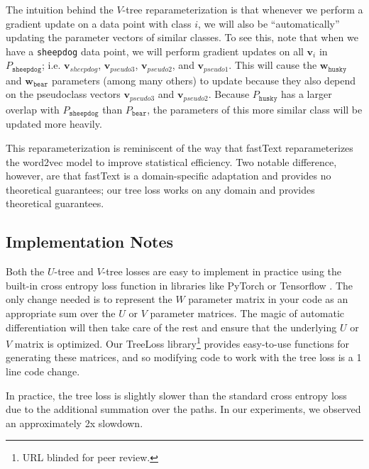 \documentclass[twoside]{article}
\newcommand{\vv}{\mathbf v}
\newcommand{\w}{\mathbf w}
\begin{document}
The intuition behind the $V$-tree reparameterization is that whenever we perform a gradient update on a data point with class $i$,
we will also be ``automatically'' updating the parameter vectors of similar classes.
To see this, note that when we have a \texttt{sheepdog} data point,
we will perform gradient updates on all $\vv_i$ in $P_\texttt{sheepdog}$; i.e. $\vv_{sheepdog}$, $\vv_{\textit{pseudo3}}$, $\vv_{\textit{pseudo2}}$, and $\vv_{\textit{pseudo1}}$.
This will cause the $\w_{\texttt{husky}}$ and $\w_{\texttt{bear}}$ parameters (among many others) to update because they also depend on the pseudoclass vectors $\vv_{\textit{pseudo3}}$ and $\vv{_\textit{pseudo2}}$.
Because $P_\texttt{husky}$ has a larger overlap with $P_\texttt{sheepdog}$ than $P_\texttt{bear}$,
the parameters of this more similar class will be updated more heavily.

This reparameterization is reminiscent of the way that fastText \citep{bojanowski2017enriching} reparameterizes the word2vec \citep{Mikolov2013EfficientEO} model to improve statistical efficiency.
Two notable difference, however, are that fastText is a domain-specific adaptation and provides no theoretical guarantees;
our tree loss works on any domain and provides theoretical guarantees.

\subsection{Implementation Notes}

Both the $U$-tree and $V$-tree losses are easy to implement in practice using the built-in cross entropy loss function in libraries like PyTorch \citep{NEURIPS2019_9015} or Tensorflow \citep{tensorflow2015-whitepaper}.
The only change needed is to represent the $W$ parameter matrix in your code as an appropriate sum over the $U$ or $V$ parameter matrices.
The magic of automatic differentiation will then take care of the rest and ensure that the underlying $U$ or $V$ matrix is optimized.
Our TreeLoss library\footnote{URL blinded for peer review.} provides easy-to-use functions for generating these matrices,
and so modifying code to work with the tree loss is a 1 line code change.

In practice, the tree loss is slightly slower than the standard cross entropy loss due to the additional summation over the paths.
In our experiments, we observed an approximately 2x slowdown.
\end{document}
